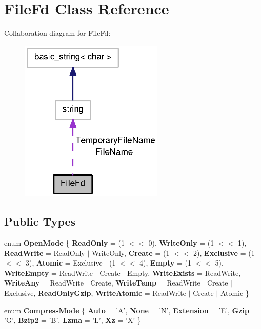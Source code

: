 \section{\-File\-Fd \-Class \-Reference}
\label{classFileFd}


\-Collaboration diagram for \-File\-Fd\-:
\nopagebreak
\begin{figure}[H]
\begin{center}
\leavevmode
\includegraphics[width=194pt]{classFileFd__coll__graph}
\end{center}
\end{figure}
\subsection*{\-Public \-Types}
\begin{DoxyCompactItemize}
\item 
enum {\bfseries \-Open\-Mode} \{ \*
{\bfseries \-Read\-Only} =  (1 $<$$<$ 0), 
{\bfseries \-Write\-Only} =  (1 $<$$<$ 1), 
{\bfseries \-Read\-Write} =  \-Read\-Only $|$ \-Write\-Only, 
{\bfseries \-Create} =  (1 $<$$<$ 2), 
\*
{\bfseries \-Exclusive} =  (1 $<$$<$ 3), 
{\bfseries \-Atomic} =  \-Exclusive $|$ (1 $<$$<$ 4), 
{\bfseries \-Empty} =  (1 $<$$<$ 5), 
{\bfseries \-Write\-Empty} =  \-Read\-Write $|$ \-Create $|$ \-Empty, 
\*
{\bfseries \-Write\-Exists} =  \-Read\-Write, 
{\bfseries \-Write\-Any} =  \-Read\-Write $|$ \-Create, 
{\bfseries \-Write\-Temp} =  \-Read\-Write $|$ \-Create $|$ \-Exclusive, 
{\bfseries \-Read\-Only\-Gzip}, 
\*
{\bfseries \-Write\-Atomic} =  \-Read\-Write $|$ \-Create $|$ \-Atomic
 \}
\item 
enum {\bfseries \-Compress\-Mode} \{ \*
{\bfseries \-Auto} =  '\-A', 
{\bfseries \-None} =  '\-N', 
{\bfseries \-Extension} =  '\-E', 
{\bfseries \-Gzip} =  '\-G', 
\*
{\bfseries \-Bzip2} =  '\-B', 
{\bfseries \-Lzma} =  '\-L', 
{\bfseries \-Xz} =  '\-X'
 \}
\end{DoxyCompactItemize}
